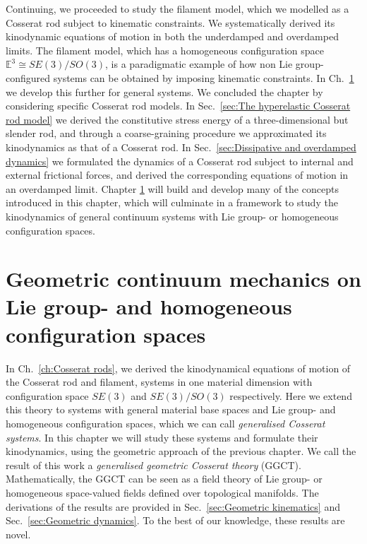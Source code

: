 Continuing, we proceeded to study the filament model, which we modelled as a Cosserat rod subject to kinematic constraints. We systematically derived its kinodynamic equations of motion in both the underdamped and overdamped limits. The filament model, which has a homogeneous configuration space $\mathbb{E}^3 \cong SE(3)/SO(3)$, is a paradigmatic example of how non Lie group-configured systems can be obtained by imposing kinematic constraints. In Ch.~\ref{ch:Geometric continuum mechanics on homogeneous configuration spaces} we develop this further for general systems. We concluded the chapter by considering specific Cosserat rod models. In Sec.~\ref{sec:The hyperelastic Cosserat rod model} we derived the constitutive stress energy of a three-dimensional but slender rod, and through a coarse-graining procedure we approximated its kinodynamics as that of a Cosserat rod. In Sec.~\ref{sec:Dissipative and overdamped dynamics} we formulated the dynamics of a Cosserat rod subject to internal and external frictional forces, and derived the corresponding equations of motion in an overdamped limit. Chapter \ref{ch:Geometric continuum mechanics on homogeneous configuration spaces} will build and develop many of the concepts introduced in this chapter, which will culminate in a framework to study the kinodynamics of general continuum systems with Lie group- or homogeneous configuration spaces. 

\chapter{Geometric continuum mechanics on Lie group- and homogeneous configuration spaces} \label{ch:Geometric continuum mechanics on homogeneous configuration spaces}


In Ch.~\ref{ch:Cosserat rods}, we derived the kinodynamical equations of motion of the Cosserat rod and filament, systems in one material dimension with configuration space $SE(3)$ and $SE(3)/SO(3)$ respectively. Here we extend this theory to systems with general material base spaces and Lie group- and homogeneous configuration spaces, which we can call \textit{generalised Cosserat systems}. In this chapter we will study these systems and formulate their kinodynamics, using the geometric approach of the previous chapter. We call the result of this work a \textit{generalised geometric Cosserat theory} (GGCT). Mathematically, the GGCT can be seen as a field theory of Lie group- or homogeneous space-valued fields defined over topological manifolds. The derivations of the results are provided in Sec.~\ref{sec:Geometric kinematics} and Sec.~\ref{sec:Geometric dynamics}. To the best of our knowledge, these results are novel.

